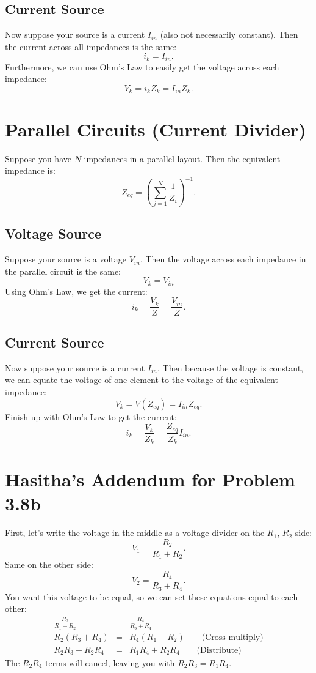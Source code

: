 \documentclass[11pt]{article}
\begin{document}
\subsection{Current Source}
Now suppose your source is a current $I_{in}$ (also not necessarily constant). Then the current across all impedances is the same:
\[i_k = I_{in}.\]
Furthermore, we can use Ohm's Law to easily get the voltage across each impedance:
\[V_k = i_k Z_k = I_{in}Z_k.\]

\section{Parallel Circuits (Current Divider)}
Suppose you have $N$ impedances in a parallel layout. Then the equivalent impedance is:
\[Z_{eq} = \left( \sum_{j=1}^N \frac{1}{Z_i} \right)^{-1}.\]

\subsection{Voltage Source}
Suppose your source is a voltage $V_{in}$. Then the voltage across each impedance in the parallel circuit is the same:
\[V_k = V_{in}\]
Using Ohm's Law, we get the current:
\[ i_k = \frac{V_k}{Z} = \frac{V_{in}}{Z}. \]

\subsection{Current Source}
Now suppose your source is a current $I_{in}$. Then because the voltage is constant, we can equate the voltage of one element to the voltage of the equivalent impedance:
\[ V_k = V(Z_{eq}) = I_{in} Z_{eq}. \]
Finish up with Ohm's Law to get the current:
\[ i_k = \frac{V_k}{Z_k} = \frac{Z_{eq}}{Z_k} I_{in}. \]

\section{Hasitha's Addendum for Problem 3.8b}
First, let's write the voltage in the middle as a voltage divider on the $R_1$, $R_2$ side: 
\[ V_1 = \frac{R_2}{R_1 + R_2}. \]
Same on the other side:
\[ V_2 = \frac{R_4}{R_3 + R_4}. \]
You want this voltage to be equal, so we can set these equations equal to each other:
\begin{eqnarray*}
\frac{R_2}{R_1 + R_2} &=&  \frac{R_4}{R_3 + R_4} \\
R_2(R_3 + R_4) &=& R_4(R_1 + R_2) \qquad \mbox{(Cross-multiply)}  \\
R_2R_3 + R_2R_4 &=& R_1R_4 + R_2R_4 \qquad \mbox{(Distribute)}
\end{eqnarray*}
The $R_2R_4$ terms will cancel, leaving you with $\boxed{R_2R_3 = R_1R_4.}$
\end{document}
